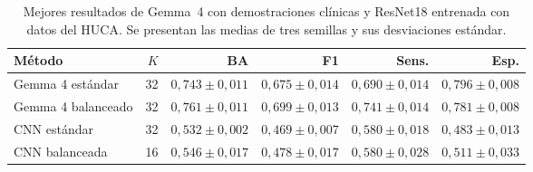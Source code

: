 \begin{table}[H]
  \centering
  \small
  \begin{tabularx}{\textwidth}{Xrrrrr}
    \toprule
    Método & \(K\) & BA & F1 & Sens. & Esp. \\
    \midrule
    Gemma 4 estándar & 32 & \(0,743 \pm 0,011\) & \(0,675 \pm 0,014\) & \(0,690 \pm 0,014\) & \(0,796 \pm 0,008\) \\
    Gemma 4 balanceado & 32 & \(0,761 \pm 0,011\) & \(0,699 \pm 0,013\) & \(0,741 \pm 0,014\) & \(0,781 \pm 0,008\) \\
    CNN estándar & 32 & \(0,532 \pm 0,002\) & \(0,469 \pm 0,007\) & \(0,580 \pm 0,018\) & \(0,483 \pm 0,013\) \\
    CNN balanceada & 16 & \(0,546 \pm 0,017\) & \(0,478 \pm 0,017\) & \(0,580 \pm 0,028\) & \(0,511 \pm 0,033\) \\
    \bottomrule
  \end{tabularx}
  \caption{Mejores resultados de Gemma~4 con demostraciones clínicas y ResNet18 entrenada con datos del HUCA. Se presentan las medias de tres semillas y sus desviaciones estándar.}
  \label{tab:comparacion_clinica_cnn}
  \resultstablenote
\end{table}
